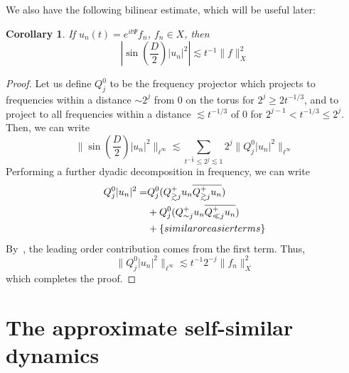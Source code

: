 \documentclass[letterpaper, reqno,final]{amsart}
\newcommand{\discrAvg}{\Psi}
\newcommand{\linProp}[1][t]{e^{i#1\discrAvg}}
\newcommand{\btext}[1]{\left\{\textup{#1}\right\}}
\newcommand{\bsime}{\btext{similar or easier terms}}
\newtheorem{cor}[thm]{Corollary}
\begin{document}
We also have the following bilinear estimate, which will be useful later:
\begin{cor}\label{cor:bilin-sin-est}
    If $u_n(t) = \linProp f_n$, $f_n \in X$, then
    \begin{equation*}
        \left| \sin\left( \frac{D}{2}\right) |u_n|^2\right| \lesssim t^{-1} \lVert f \rVert_X^2
    \end{equation*}
\end{cor}
\begin{proof}
    Let us define $Q_j^0$ to be the frequency projector which projects to frequencies within a distance $\sim 2^j$ from $0$ on the torus for $2^j \geq 2t^{-1/3}$, and to project to all frequencies within a distance $\lesssim t^{-1/3}$ of $0$ for $2^{j-1} < t^{-1/3} \leq 2^j$.  Then, we can write
    \begin{equation*}
        \lVert \sin\left( \frac{D}{2}\right) |u_n|^2 \rVert_{\ell^\infty} \lesssim \sum_{t^{-\frac{1}{3}} \leq 2^j \lesssim 1} 2^j \lVert Q_j^0 |u_n|^2 \rVert_{\ell^\infty}
    \end{equation*}
    Performing a further dyadic decomposition in frequency, we can write
    \begin{equation*}\begin{split}
        Q_j^0 |u_n|^2 =& Q_j^0(Q_{\gtrsim j}^+ u_n \overline{Q_{\gtrsim j}^+ u_n})\\
        &+ Q_j^0(Q_{\sim j}^+ u_n \overline{Q_{\ll j}^+ u_n})\\
        &+ \bsime
    \end{split}\end{equation*}
    By~, the leading order contribution comes from the first term.  Thus,
    \begin{equation*}
        \lVert Q_j^0 |u_n|^2 \rVert_{\ell^\infty} \lesssim t^{-1} 2^{-j} \lVert f_n \rVert_{X}^2
    \end{equation*}
    which completes the proof.
\end{proof}

\section{The approximate self-similar dynamics}\label{sec:approx-ss}
\end{document}
